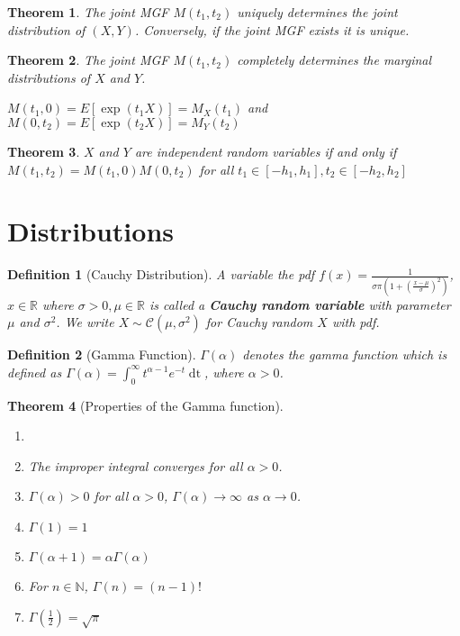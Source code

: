 \documentclass[12pt,twoside]{report}
\newtheorem{defn}{Definition}
\newtheorem{thm}{Theorem}
\begin{document}
\begin{thm}
    The joint MGF $M(t_1, t_2)$ uniquely determines the joint distribution of $(X, Y)$.
    Conversely, if the joint MGF exists it is unique.
\end{thm}

\begin{thm}
    The joint MGF $M(t_1, t_2)$ completely determines the marginal distributions of $X$ and $Y$. 

    $M(t_1, 0) = E[\exp(t_1 X)] = M_X (t_1)$ and $M(0, t_2) = E[\exp(t_2 X)] = M_Y(t_2)$
\end{thm}

\begin{thm}
    $X$ and $Y$ are independent random variables if and only if $M(t_1, t_2) = M(t_1, 0) M(0, t_2)$ for all $t_1 \in [-h_1, h_1], t_2 \in [-h_2, h_2]$
\end{thm}

\section{Distributions}

\begin{defn}[Cauchy Distribution]
    A variable the pdf $f(x) = \displaystyle \frac{1}{\sigma \pi (1 + \left( \frac{x - \mu}{\sigma} \right)^2 )}$, $x \in \mathbb{R}$ where $\sigma > 0, \mu \in \mathbb{R}$ is called a \textbf{Cauchy random variable} with parameter $\mu$ and $\sigma^2$. 
    We write $X \sim \mathcal{C}(\mu, \sigma^2)$ for Cauchy random $X$ with pdf.
\end{defn}

\begin{defn}[Gamma Function]
    $\Gamma(\alpha)$ denotes the gamma function which is defined as $\Gamma(\alpha) = \displaystyle\int_0^\infty t ^{\alpha - 1} e ^{-t} \mathop{\mathrm{d} t}$, where $\alpha > 0$.
\end{defn}

\begin{thm}[Properties of the Gamma function]
    \begin{enumerate}
        \item[]
        \item The improper integral converges for all $\alpha > 0$. 
        \item $\Gamma(\alpha) > 0$  for all $\alpha > 0$, $\Gamma(\alpha) \to \infty$ as $\alpha \to 0$. 
        \item $\Gamma(1) = 1$
        \item $\Gamma(\alpha + 1) = \alpha \Gamma(\alpha)$
        \item For $n \in \mathbb{N}$, $\Gamma(n) = (n-1)!$
        \item $\Gamma(\frac{1}{2}) = \sqrt{\pi}$
    \end{enumerate}
\end{thm}
\end{document}
